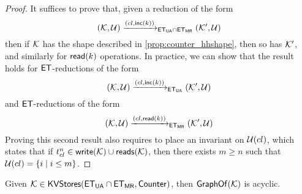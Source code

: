 \begin{proof}
It suffices to prove that, given a reduction of the form 
\[
(\mathcal{K}, \mathcal{U}) \xrightarrow{({cl}, \mathsf{inc}(k))}_{\mathsf{ET}_{\mathsf{UA}} \cap \mathsf{ET}_{\mathsf{MR}}} (\mathcal{K}', \mathcal{U})
\]
then if $\mathcal{K}$ has the shape described in \cref{prop:counter_hhshape}, then so has $\mathcal{K}'$, 
and similarly for $\mathsf{read}(k)$ operations. In practice, we can show that the result holds for 
$\mathsf{ET}$-reductions of the form 
\[
(\mathcal{K}, \mathcal{U}) \xrightarrow{({cl}, \mathsf{inc}(k))}_{\mathsf{ET}_{\mathsf{UA}}} (\mathcal{K}', \mathcal{U})
\]
and $\mathsf{ET}$-reductions of the form 
\[
(\mathcal{K}, \mathcal{U}) \xrightarrow{({cl}, \mathsf{read}(k))}_{\mathsf{ET}_{\mathsf{MR}}} (\mathcal{K}', \mathcal{U})
\]
Proving this second result also requires to place an invariant on $\mathcal{U}({cl})$, which states 
that if $t_{{cl}}^{n} \in \mathsf{write}(\mathcal{K}) \cup \mathsf{reads}(\mathcal{K})$, then there exists $m \geq n$ such that 
$\mathcal{U}({cl}) = \{i \mid i \leq m\}$.
\end{proof}

\begin{corollary}
Given $\mathcal{K} \in \mathsf{KVStores}(\mathsf{ET}_{\mathsf{UA}} \cap \mathsf{ET}_{\mathsf{MR}}, \mathsf{Counter})$, 
then $\mathsf{GraphOf}(\mathcal{K})$ is acyclic.
\end{corollary}
